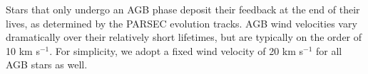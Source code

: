 \documentclass[fleqn,usenatbib,useAMS]{mnras}
\newcommand{\ccunit}{cm$^{-3}$}
\begin{document}


Stars that only undergo an AGB phase deposit their feedback at the end of their lives, as determined by the PARSEC evolution tracks. AGB wind velocities vary dramatically over their relatively short lifetimes, but are typically on the order of 10 km s$^{-1}$. For simplicity, we adopt a fixed wind velocity of 20 km s$^{-1}$ for all AGB stars as well.
\end{document}
